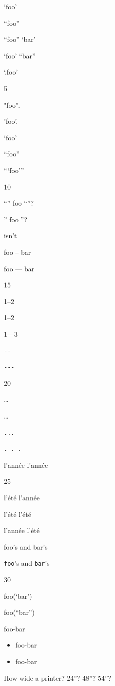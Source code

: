 
\def\mytitle{Smart Quotes}


`foo'

``foo''

``foo'' `bar'

`foo' ``bar''

`.foo'

5

"foo".

'foo'.

`foo'

``foo''

```foo'''

10

``'' foo ``''?

'' foo ''?

isn't

foo -- bar

foo --- bar

15

1--2

1--2

1---3

\texttt{-{}-}

\texttt{-{}-{}-}

20

{\ldots}

{\ldots}

\texttt{...}

\texttt{. . .}

l'année l'année

25

l'été l'année

l'été l'été

l'année l'été

foo's and bar's

\texttt{foo}'s and \texttt{bar}'s

30

foo(`bar')

foo(``bar'')

foo-bar

\begin{itemize}
\item foo-bar
\item foo-bar
\end{itemize}

How wide a printer? 24''? 48''? 54''?


